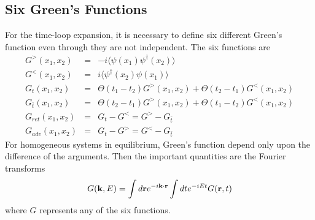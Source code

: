 \subsection{Six Green's Functions}
For the time-loop expansion, it is necessary to define six different Green's function even through they are not independent.
The six functions are
\begin{eqnarray}
  G^>(x_1,x_2) &=& -i\langle \psi(x_1) \psi^\dagger(x_2) \rangle \nonumber \\
  G^<(x_1,x_2) &=& i\langle \psi^\dagger(x_2) \psi(x_1) \rangle \nonumber \\
  G_t(x_1,x_2) &=& \Theta(t_1-t_2) G^>(x_1,x_2) + \Theta(t_2-t_1)G^<(x_1,x_2) \nonumber \\
  G_{\bar{t}}(x_1,x_2) &=& \Theta(t_2-t_1) G^>(x_1,x_2) +\Theta(t_1-t_2) G^<(x_1,x_2) \nonumber \\
  G_{ret}(x_1,x_2) &=& G_t - G^< = G^> - G_{\bar{t}}  \nonumber \\
  G_{adv}(x_1,x_2) &=& G_t -G^> = G^< -G_{\bar{t}} \label{2.144}
\end{eqnarray}
For homogeneous systems in equilibrium, Green's function depend only upon the difference of the arguments.
Then the important quantities are the Fourier transforms
\begin{equation}
  \label{2.145}
  G(\mathbf{k},E) = \int d\mathbf{r} e^{-i\mathbf{k} \cdot \mathbf{r}} \int dt e^{-iEt} G(\mathbf{r},t)
\end{equation}
where $G$ represents any of the six functions.


